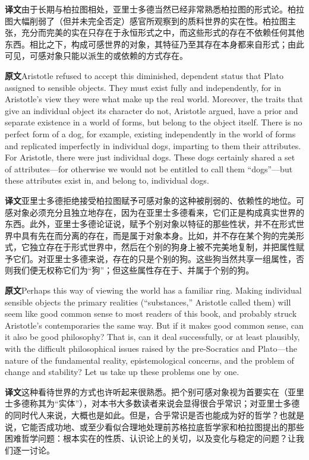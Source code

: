 \documentclass[UTF8,zihao=-4]{ctexart}
\newcommand{\BodyFont}{\fontsize{10.5pt}{15.5pt}\selectfont}
\newcommand{\origlabel}{\textbf{原文}\quad}
\newcommand{\translabel}{\textbf{译文}\quad}
\newcommand{\orig}{\par\noindent\begingroup\BodyFont\origlabel}
\newcommand{\zhline}[1]{\par\endgroup\noindent\begingroup\BodyFont\translabel #1\par\endgroup\vspace{0.35em}}
\begin{document}
\zhline{由于长期与柏拉图相处，亚里士多德当然已经非常熟悉柏拉图的形式论。柏拉图大幅削弱了（但并未完全否定）感官所观察到的质料世界的实在性。柏拉图主张，充分而完美的实在只存在于永恒形式之中，而这些形式的存在不依赖任何其他东西。相比之下，构成可感世界的对象，其特征乃至其存在本身都来自形式；由此可见，可感对象只能以派生的或依赖的方式存在。}

\orig Aristotle refused to accept this diminished, dependent status that Plato assigned to sensible objects. They must exist fully and independently, for in Aristotle's view they were what make up the real world. Moreover, the traits that give an individual object its character do not, Aristotle argued, have a prior and separate existence in a world of forms, but belong to the object itself. There is no perfect form of a dog, for example, existing independently in the world of forms and replicated imperfectly in individual dogs, imparting to them their attributes. For Aristotle, there were just individual dogs. These dogs certainly shared a set of attributes---for otherwise we would not be entitled to call them ``dogs''---but these attributes exist in, and belong to, individual dogs.

\zhline{亚里士多德拒绝接受柏拉图赋予可感对象的这种被削弱的、依赖性的地位。可感对象必须充分且独立地存在，因为在亚里士多德看来，它们正是构成真实世界的东西。此外，亚里士多德论证说，赋予个别对象以特征的那些性状，并不在形式世界中具有先在而分离的存在，而是属于对象本身。比如，并不存在某个狗的完美形式，它独立存在于形式世界中，然后在个别的狗身上被不完美地复制，并把属性赋予它们。对亚里士多德来说，存在的只是个别的狗。这些狗当然共享一组属性，否则我们便无权称它们为“狗”；但这些属性存在于、并属于个别的狗。}

\orig Perhaps this way of viewing the world has a familiar ring. Making individual sensible objects the primary realities (``substances,'' Aristotle called them) will seem like good common sense to most readers of this book, and probably struck Aristotle's contemporaries the same way. But if it makes good common sense, can it also be good philosophy? That is, can it deal successfully, or at least plausibly, with the difficult philosophical issues raised by the pre-Socratics and Plato---the nature of the fundamental reality, epistemological concerns, and the problem of change and stability? Let us take up these problems one by one.

\zhline{这种看待世界的方式也许听起来很熟悉。把个别可感对象视为首要实在（亚里士多德称其为“实体”），对本书大多数读者来说会显得很合乎常识；对亚里士多德的同时代人来说，大概也是如此。但是，合乎常识是否也能成为好的哲学？也就是说，它能否成功地、或至少看似合理地处理前苏格拉底哲学家和柏拉图提出的那些困难哲学问题：根本实在的性质、认识论上的关切，以及变化与稳定的问题？让我们逐一讨论。}
\end{document}
